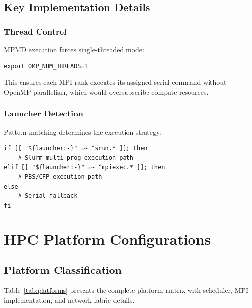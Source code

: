 \documentclass[11pt,a4paper,twoside]{article}
\begin{document}
\subsection{Key Implementation Details}

\subsubsection{Thread Control}

MPMD execution forces single-threaded mode:

\begin{lstlisting}[style=bashstyle,caption={Thread Control in MPMD},label={lst:thread}]
export OMP_NUM_THREADS=1
\end{lstlisting}

This ensures each MPI rank executes its assigned serial command without OpenMP parallelism, which would oversubscribe compute resources.

\subsubsection{Launcher Detection}

Pattern matching determines the execution strategy:

\begin{lstlisting}[style=bashstyle,caption={Launcher Pattern Detection},label={lst:launcher}]
if [[ "${launcher:-}" =~ ^srun.* ]]; then
    # Slurm multi-prog execution path
elif [[ "${launcher:-}" =~ ^mpiexec.* ]]; then
    # PBS/CFP execution path
else
    # Serial fallback
fi
\end{lstlisting}

\section{HPC Platform Configurations}
\label{sec:platforms}

\subsection{Platform Classification}

Table~\ref{tab:platforms} presents the complete platform matrix with scheduler, MPI implementation, and network fabric details.
\end{document}
